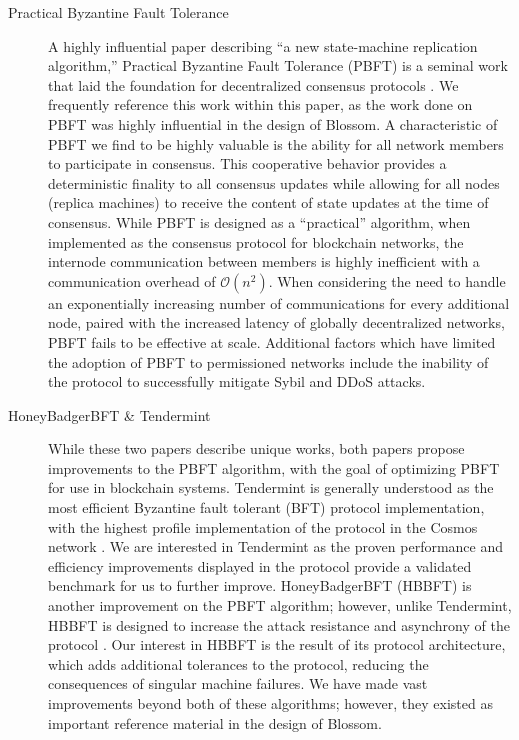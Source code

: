 \begin{description}
\item[Practical Byzantine Fault Tolerance] A highly influential paper describing “a new state-machine replication algorithm,” Practical Byzantine Fault Tolerance (PBFT) is a seminal work that laid the foundation for decentralized consensus protocols \cite{Castro2002}. We frequently reference this work within this paper, as the work done on PBFT was highly influential in the design of Blossom. A characteristic of PBFT we find to be highly valuable is the ability for all network members to participate in consensus. This cooperative behavior provides a deterministic finality to all consensus updates while allowing for all nodes (replica machines) to receive the content of state updates at the time of consensus. While PBFT is designed as a “practical” algorithm, when implemented as the consensus protocol for blockchain networks, the internode communication between members is highly inefficient with a communication overhead of \(\mathcal{O}(n^2)\). When considering the need to handle an exponentially increasing number of communications for every additional node, paired with the increased latency of globally decentralized networks, PBFT fails to be effective at scale. Additional factors which have limited the adoption of PBFT to permissioned networks include the inability of the protocol to successfully mitigate Sybil and DDoS attacks.
\item[HoneyBadgerBFT \& Tendermint] While these two papers describe unique works, both papers propose improvements to the PBFT algorithm, with the goal of optimizing PBFT for use in blockchain systems. Tendermint is generally understood as the most efficient Byzantine fault tolerant (BFT) protocol implementation, with the highest profile implementation of the protocol in the Cosmos network \cite{Buchman2016} \cite{kwon2019cosmos}. We are interested in Tendermint as the proven performance and efficiency improvements displayed in the protocol provide a validated benchmark for us to further improve. HoneyBadgerBFT (HBBFT) is another improvement on the PBFT algorithm; however, unlike Tendermint, HBBFT is designed to increase the attack resistance and asynchrony of the protocol \cite{Miller2016}. Our interest in HBBFT is the result of its protocol architecture, which adds additional tolerances to the protocol, reducing the consequences of singular machine failures. We have made vast improvements beyond both of these algorithms; however, they existed as important reference material in the design of Blossom.

\end{description}
